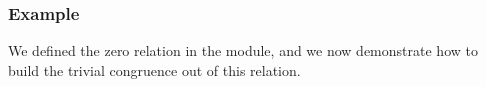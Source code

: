 \begin{code}
%
\>[1]\<%
\\
\>[1][@{}l@{\AgdaIndent{0}}]%
\>[2]\AgdaSpace{}%
\AgdaSymbol{:}\AgdaSpace{}%
\AgdaSpace{}%
\AgdaSpace{}%
\AgdaSpace{}%
\AgdaSpace{}%
\<%
\\
%
\>[2]\AgdaSpace{}%
\AgdaSymbol{:}\AgdaSpace{}%
\AgdaSpace{}%
\AgdaSpace{}%
\<%
\\
%
\>[2]\AgdaSpace{}%
\AgdaSymbol{:}\AgdaSpace{}%
\AgdaSpace{}%
\<%
\\
%
\\[\AgdaEmptyExtraSkip]%
\>[0]\AgdaSpace{}%
\<%
\end{code}

\subsubsection{Example}\label{cong-example}
We defined the zero relation  in the \ualibDiscrete module, and we now demonstrate how to build the trivial congruence out of this relation.

